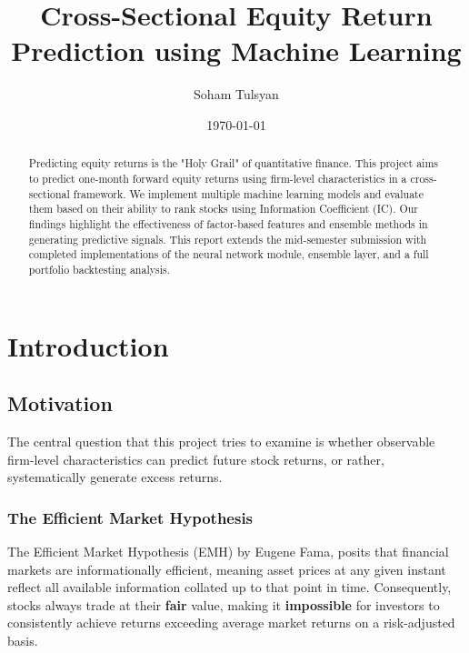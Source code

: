 \documentclass[11pt]{article}
\title{Cross-Sectional Equity Return Prediction using Machine Learning}
\author{Soham Tulsyan}
\date{\today}
\begin{document}
\maketitle

\begin{abstract}
Predicting equity returns is the "Holy Grail" of quantitative finance. This project aims to predict one-month forward equity returns using firm-level characteristics in a cross-sectional framework. We implement multiple machine learning models and evaluate them based on their ability to rank stocks using Information Coefficient (IC). Our findings highlight the effectiveness of factor-based features and ensemble methods in generating predictive signals. This report extends the mid-semester submission with completed implementations of the neural network module, ensemble layer, and a full portfolio backtesting analysis.
\end{abstract}

\section{Introduction}

\subsection{Motivation}
The central question that this project tries to examine is whether observable firm-level characteristics can predict future stock returns, or rather, systematically generate excess returns.
\subsubsection{The Efficient Market Hypothesis}
The Efficient Market Hypothesis (EMH) by Eugene Fama, posits that financial markets are informationally efficient, meaning asset prices at any given instant reflect all available information collated up to that point in time. Consequently, stocks always trade at their \textbf{fair} value, making it \textbf{impossible} for investors to consistently achieve returns exceeding average market returns on a risk-adjusted basis.
\end{document}
